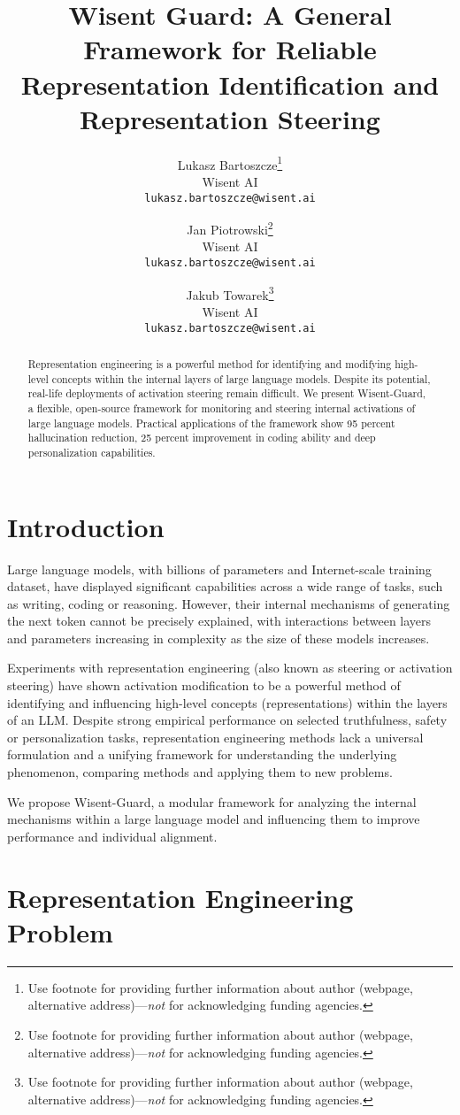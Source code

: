\documentclass{article}
\title{Wisent Guard: A General Framework for Reliable Representation Identification and Representation Steering}
\author{%
  Lukasz Bartoszcze\thanks{Use footnote for providing further information
    about author (webpage, alternative address)---\emph{not} for acknowledging
    funding agencies.} \\
  Wisent AI \\
  \texttt{lukasz.bartoszcze@wisent.ai} \\
}
\author{%
  Jan Piotrowski\thanks{Use footnote for providing further information
    about author (webpage, alternative address)---\emph{not} for acknowledging
    funding agencies.} \\
  Wisent AI \\
  \texttt{lukasz.bartoszcze@wisent.ai} \\
}
\author{%
  Jakub Towarek\thanks{Use footnote for providing further information
    about author (webpage, alternative address)---\emph{not} for acknowledging
    funding agencies.} \\
  Wisent AI \\
  \texttt{lukasz.bartoszcze@wisent.ai} \\
}
\begin{document}
\maketitle

\begin{abstract}
  Representation engineering is a powerful method for identifying and modifying high-level concepts within the internal layers of large language models. Despite its potential, real-life deployments of activation steering remain difficult. We present Wisent-Guard, a flexible, open-source framework for monitoring and steering internal activations of large language models. Practical applications of the framework show 95 percent hallucination reduction, 25 percent improvement in coding ability and deep personalization capabilities. 
\end{abstract}

\section{Introduction}

Large language models, with billions of parameters and Internet-scale training dataset, have displayed significant capabilities across a wide range of tasks, such as writing, coding or reasoning. However, their internal mechanisms of generating the next token cannot be precisely explained, with interactions between layers and parameters increasing in complexity as the size of these models increases. 

Experiments with representation engineering (also known as steering or activation steering) have shown activation modification to be a powerful method of identifying and influencing high-level concepts (representations) within the layers of an LLM. Despite strong empirical performance on selected truthfulness, safety or personalization tasks, representation engineering methods lack a universal formulation and a unifying framework for understanding the underlying phenomenon, comparing methods and applying them to new problems. 

We propose Wisent-Guard, a modular framework for analyzing the internal mechanisms within a large language model and influencing them to improve performance and individual alignment. 

\section{Representation Engineering Problem}
\end{document}
